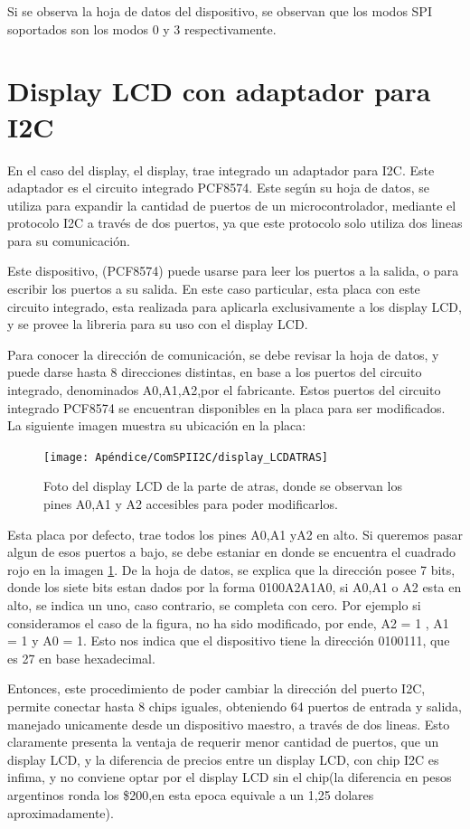Si se observa la hoja de datos del dispositivo, se observan que los modos SPI soportados son los modos 0 y 3 respectivamente. 


\section{Display LCD con adaptador para I2C }

En el caso del display, el display, trae integrado un adaptador para I2C. Este adaptador es el circuito integrado PCF8574. Este según su hoja de datos, se utiliza para expandir la cantidad de puertos de un microcontrolador, mediante el protocolo I2C a través de dos puertos, ya que este protocolo solo utiliza dos lineas para su comunicación. 

Este dispositivo, (PCF8574) puede usarse para leer los puertos a la salida, o para escribir los puertos a su salida. En este caso particular, esta placa con este circuito integrado, esta realizada para aplicarla exclusivamente a los display LCD, y se provee la libreria para su uso con el display LCD. 

Para conocer la dirección de comunicación, se debe revisar la hoja de datos, y puede darse hasta 8 direcciones distintas, en base a los puertos del circuito integrado, denominados A0,A1,A2,por el fabricante. Estos puertos del circuito integrado PCF8574 se encuentran disponibles en la placa para ser modificados. La siguiente imagen muestra su ubicación en la placa: 

\begin{figure}[ht]
	\texttt{[image: Apéndice/ComSPII2C/display\_LCDATRAS]}
	\caption{Foto del display LCD de la parte de atras, donde se observan los pines A0,A1 y A2 accesibles para poder modificarlos.}
	\label{fig:pcf8574_LCD} 
\end{figure}

Esta placa por defecto, trae todos los pines A0,A1 yA2 en alto. Si queremos pasar algun de esos puertos a bajo, se debe estaniar en donde se encuentra el cuadrado rojo en la imagen \ref{fig:pcf8574_LCD}. De la hoja de datos, se explica que la dirección posee 7 bits, donde los siete bits estan dados por la forma 0100A2A1A0, si A0,A1 o A2 esta en alto, se indica un uno, caso contrario, se completa con cero. Por ejemplo si consideramos el caso de la figura, no ha sido modificado, por ende, A2 = 1 , A1 = 1 y A0 = 1. Esto nos indica que el dispositivo tiene la dirección 0100111, que es 27 en base hexadecimal. 

Entonces, este procedimiento de poder cambiar la dirección del puerto I2C, permite conectar hasta 8 chips iguales, obteniendo 64 puertos de entrada y salida, manejado unicamente desde un dispositivo maestro, a través de dos lineas. Esto claramente presenta la ventaja de requerir menor cantidad de puertos, que un display LCD, y la diferencia de precios entre un display LCD, con chip I2C es infima, y no conviene optar por el display LCD sin el chip(la diferencia en pesos argentinos ronda los \$200,en esta epoca equivale a un 1,25 dolares aproximadamente). 


